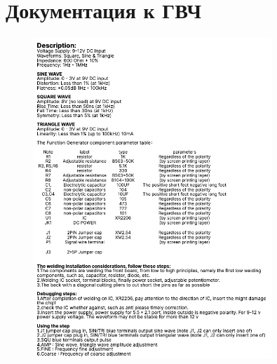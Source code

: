 \documentclass[14pt]{extreport}
\begin{document}
\begin{sloppypar}
\chapter{Документация к ГВЧ}
\label{appendgenerator}
\begin{figure}[ht]
	\centering
	\includegraphics[width=0.8\textwidth]{./images/generator.png}
	\label{fig:generator}
\end{figure}



\end{sloppypar}
\end{document}
